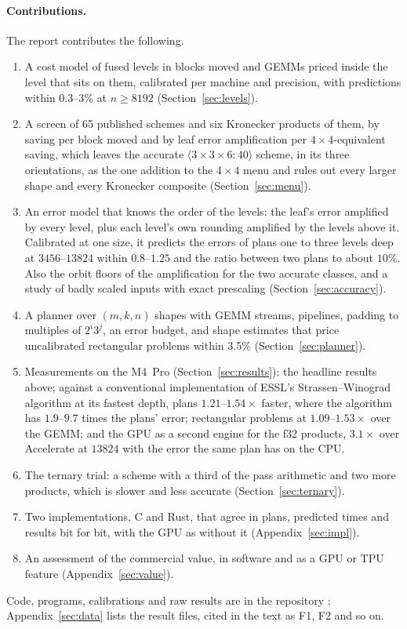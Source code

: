 \documentclass[11pt]{article}
\newcommand{\mm}[1]{\langle #1\rangle}
\begin{document}
\paragraph{Contributions.}
The report contributes the following.
\begin{enumerate}
\item A cost model of fused levels in blocks moved and GEMMs priced inside
  the level that sits on them, calibrated per machine and precision, with
  predictions within 0.3--3\% at $n\ge 8192$ (Section~\ref{sec:levels}).
\item A screen of 65 published schemes and six Kronecker products of them, by saving per block moved and by leaf
  error amplification per $4\times4$-equivalent saving, which leaves the
  accurate $\mm{3\times3\times6:40}$ scheme, in its three orientations, as
  the one addition to the $4\times4$ menu and rules out every larger shape
  and every Kronecker composite (Section~\ref{sec:menu}).
\item An error model that knows the order of the levels: the leaf's error
  amplified by every level, plus each level's own rounding amplified by the
  levels above it.  Calibrated at one size, it predicts the errors of plans
  one to three levels deep at $3456$--$13824$ within $0.8$--$1.25$ and the
  ratio between two plans to about $10\%$.  Also the orbit floors of
  the amplification for the two accurate classes, and a study of badly
  scaled inputs with exact prescaling (Section~\ref{sec:accuracy}).
\item A planner over $(m,k,n)$ shapes with GEMM streams, pipelines, padding
  to multiples of $2^i3^j$, an error budget, and shape estimates that price
  uncalibrated rectangular problems within 3.5\% (Section~\ref{sec:planner}).
\item Measurements on the M4~Pro (Section~\ref{sec:results}): the headline
  results above; against a conventional implementation of ESSL's Strassen--Winograd algorithm at its fastest depth, plans $1.21$--$1.54\times$ faster, where the algorithm has
  $1.9$--$9.7$ times the plans' error; rectangular problems at
  $1.09$--$1.53\times$ over the GEMM; and the GPU as a second engine for the
  f32 products, $3.1\times$ over Accelerate at $13824$ with the error the
  same plan has on the CPU.
\item The ternary trial: a scheme with a third of the pass arithmetic and
  two more products, which is slower and less accurate
  (Section~\ref{sec:ternary}).
\item Two implementations, C and Rust, that agree in plans, predicted times
  and results bit for bit, with the GPU as without it
  (Appendix~\ref{sec:impl}).
\item An assessment of the commercial value, in software and as a GPU or
  TPU feature (Appendix~\ref{sec:value}).
\end{enumerate}
Code, programs, calibrations and raw results are in the repository
\cite{logic}; Appendix~\ref{sec:data} lists the result files, cited in the
text as F1, F2 and so on.
\end{document}

